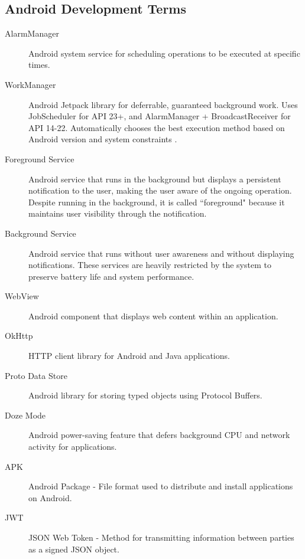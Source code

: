 \subsection{Android Development Terms}

\begin{description}
    \item[AlarmManager] Android system service for scheduling operations to be executed at specific times.
    
    \item[WorkManager] Android Jetpack library for deferrable, guaranteed background work. Uses JobScheduler for API 23+, and AlarmManager + BroadcastReceiver for API 14-22. Automatically chooses the best execution method based on Android version and system constraints \cite{android-workmanager}.
    
    \item[Foreground Service] Android service that runs in the background but displays a persistent notification to the user, making the user aware of the ongoing operation. Despite running in the background, it is called ``foreground" because it maintains user visibility through the notification.
    
    \item[Background Service] Android service that runs without user awareness and without displaying notifications. These services are heavily restricted by the system to preserve battery life and system performance.
    
    \item[WebView] Android component that displays web content within an application.
    
    \item[OkHttp] HTTP client library for Android and Java applications.
    
    \item[Proto Data Store] Android library for storing typed objects using Protocol Buffers.
    
    \item[Doze Mode] Android power-saving feature that defers background CPU and network activity for applications.
    
    \item[APK] Android Package - File format used to distribute and install applications on Android.
    
    \item[JWT] JSON Web Token - Method for transmitting information between parties as a signed JSON object.
\end{description}
